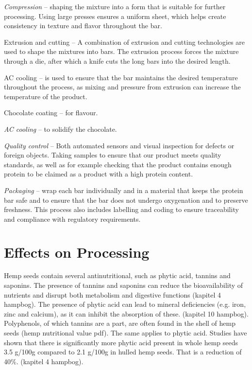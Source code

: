 \vspace{1em}
\textit{Compression} – shaping the mixture into a form that is suitable for further processing. Using large presses ensures a uniform sheet, which helps create consistency in texture and flavor throughout the bar.

\vspace{1em}
Extrusion and cutting – A combination of extrusion and cutting technologies are used to shape the mixtures into bars. The extrusion process forces the mixture through a die, after which a knife cuts the long bars into the desired length.

\vspace{1em}
AC cooling – is used to ensure that the bar maintains the desired temperature throughout the process, as mixing and pressure from extrusion can increase the temperature of the product.

\vspace{1em}
Chocolate coating – for flavour.

\vspace{1em}
\textit{AC cooling} – to solidify the chocolate.

\vspace{1em}
\textit{Quality control} – Both automated sensors and visual inspection for defects or foreign objects. Taking samples to ensure that our product meets quality standards, as well as for example checking that the product contains enough protein to be claimed as a product with a high protein content. 

\vspace{1em}
\textit{Packaging} – wrap each bar individually and in a material that keeps the protein bar safe and to ensure that the bar does not undergo oxygenation and to preserve freshness. This process also includes labelling and coding to ensure traceability and compliance with regulatory requirements.

\section{Effects on Processing}
Hemp seeds contain several antinutritional, such as phytic acid, tannins and saponins. The presence of tannins and saponins can reduce the bioavailability of nutrients and disrupt both metabolism and digestive functions (kapitel 4 hampbog). The presence of phytic acid can lead to mineral deficiencies (e.g. iron, zinc and calcium), as it can inhibit the absorption of these. (kapitel 10 hampbog). Polyphenols, of which tannins are a part, are often found in the shell of hemp seeds (hemp nutritional value pdf). The same applies to phytic acid. Studies have shown that there is significantly more phytic acid present in whole hemp seeds 3.5 g/100g compared to 2.1 g/100g in hulled hemp seeds. That is a reduction of 40\%. (kapitel 4 hampbog).

